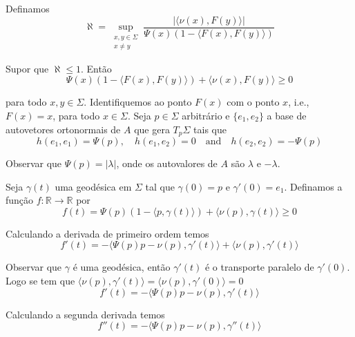 Definamos
\begin{equation*}
	\aleph = \sup_{\substack{x,y \in \Sigma\\ x \neq y}} \frac{| \langle  \nu(x), F(y) \rangle |}{\Psi(x) (1 - \langle F(x), F(y) \rangle)}
\end{equation*}

Supor que $\aleph \leq 1$. Então
\begin{equation*}
	\Psi(x) (1 - \langle F(x), F(y) \rangle) + \langle \nu(x), F(y) \rangle \geq 0
\end{equation*}

para todo $ x,y \in \Sigma $. Identifiquemos ao ponto $F(x)$ com o ponto $x$, i.e., $F(x) = x$, para todo $x \in \Sigma$. Seja $p \in \Sigma$ arbitrário e $\{ e_1, e_2 \}$ a base de autovetores ortonormais de $A$ que gera $T_{p} \Sigma$ tais que
\begin{equation*}
	h(e_1,e_1) = \Psi(p), \quad h(e_1,e_2)=0 \quad \text{and} \quad h(e_2,e_2) = -\Psi(p)
\end{equation*}

Observar que $\Psi(p) = |\lambda|$, onde os autovalores de $A$ são $\lambda$ e $-\lambda$.

Seja $\gamma(t)$ uma geodésica em $\Sigma$ tal que $\gamma(0)=p$ e $\gamma'(0)=e_1$. Definamos a função $f: \mathbb{R} \rightarrow \mathbb{R}$ por
\begin{equation*}
	f(t) = \Psi(p) (1 - \langle p, \gamma(t) \rangle) + \langle \nu(p), \gamma(t) \rangle \geq 0
\end{equation*}

Calculando a derivada de primeiro ordem temos
\begin{equation*}
	f'(t) = -\langle \Psi(p) p - \nu(p), \gamma'(t) \rangle + \langle \nu(p), \gamma'(t) \rangle
\end{equation*}

Observar que $ \gamma $ é uma geodésica, então $ \gamma'(t) $ é  o transporte paralelo de $ \gamma'(0) $. Logo se tem que $ \langle \nu(p), \gamma'(t) \rangle = \langle \nu(p), \gamma'(0) \rangle = 0 $
\begin{equation*}
	f'(t) = -\langle \Psi(p) p - \nu(p), \gamma'(t) \rangle
\end{equation*}

Calculando a segunda derivada temos
\begin{equation*}
	f''(t) = -\langle \Psi(p) p - \nu(p), \gamma''(t) \rangle
\end{equation*}

